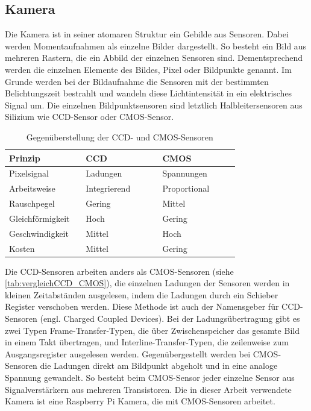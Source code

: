 \subsection{Kamera}
Die Kamera ist in seiner atomaren Struktur ein Gebilde aus Sensoren. Dabei werden Momentaufnahmen als einzelne Bilder dargestellt. So besteht ein Bild aus mehreren Rastern, die ein Abbild der einzelnen Sensoren sind. Dementsprechend werden die einzelnen Elemente des Bildes, Pixel oder Bildpunkte genannt. Im Grunde werden bei der Bildaufnahme die Sensoren mit der bestimmten Belichtungszeit bestrahlt und wandeln diese Lichtintensität in ein elektrisches Signal um. Die einzelnen Bildpunktsensoren sind letztlich Halbleitersensoren aus Silizium wie CCD-Sensor oder CMOS-Sensor. 
\begin{table}[H]
\begin{tabular*}{\linewidth}{p{0.3\linewidth}|p{0.3\linewidth}|p{0.3\linewidth}}
\hline
\textbf{Prinzip}          & \textbf{CCD}         & \textbf{CMOS}        \\ \hline\hline
Pixelsignal      & Ladungen     & Spannungen   \\ \hline
Arbeitsweise     & Integrierend & Proportional \\ \hline
Rauschpegel      & Gering       & Mittel       \\ \hline
Gleichförmigkeit & Hoch         & Gering       \\ \hline
Geschwindigkeit  & Mittel       & Hoch         \\ \hline
Kosten           & Mittel       & Gering       \\ \hline
\end{tabular*}
\caption{Gegenüberstellung der CCD- und CMOS-Sensoren \cite[S.371]{SensorenAutomation.2014}}
\label{tab:vergleichCCD_CMOS}
\end{table}
Die CCD-Sensoren arbeiten anders als CMOS-Sensoren (siehe \autoref{tab:vergleichCCD_CMOS}), die einzelnen Ladungen der Sensoren werden in kleinen Zeitabständen ausgelesen, indem die Ladungen durch ein Schieber Register verschoben werden. Diese Methode ist auch der Namensgeber für CCD-Sensoren (engl. Charged Coupled Devices). Bei der Ladungsübertragung gibt es zwei Typen Frame-Transfer-Typen, die über Zwischenspeicher das gesamte Bild in einem Takt übertragen, und Interline-Transfer-Typen, die zeilenweise zum Ausgangsregister ausgelesen werden. Gegenübergestellt werden bei CMOS-Sensoren die Ladungen direkt am Bildpunkt abgeholt und in eine analoge Spannung gewandelt. So besteht beim CMOS-Sensor jeder einzelne Sensor aus Signalverstärkern aus mehreren Transistoren. Die in dieser Arbeit verwendete Kamera ist eine Raspberry Pi Kamera, die mit CMOS-Sensoren arbeitet. 

